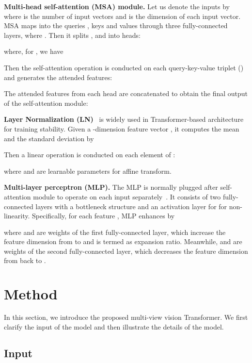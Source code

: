 \documentclass{bmvc2k}
\begin{document}
\vspace{0.1in}
\noindent \textbf{Multi-head self-attention (MSA) module.} Let us denote the inputs by  where  is the number of input vectors and  is the dimension of each input vector. MSA maps  into the queries , keys  and values  through three fully-connected layers, where . Then it splits ,  and  into  heads:

where, for , we have

Then the self-attention operation is conducted on each query-key-value triplet   () and generates the attended features:

The attended features from each head are concatenated to obtain the final output of the self-attention module:


\noindent \textbf{Layer Normalization (LN)}~\cite{ba2016layer} is widely used in Transformer-based architecture for training stability.  Given a -dimension feature vector , it  computes the mean  and the standard deviation  by

Then a linear operation is conducted on each element of :

where  and  are learnable parameters for affine transform.

\vspace{0.1in}

\noindent \textbf{Multi-layer perceptron (MLP).} The MLP is normally plugged after self-attention module to operate on each input separately~\cite{vaswani2017attention}. It consists of two fully-connected layers with a bottleneck structure and an activation layer for for non-linearity. Specifically, for each feature , MLP enhances  by 

where  and  are weights of the first fully-connected layer,  which increase the feature dimension from  to  and  is termed as expansion ratio. Meanwhile,  and  are weights of the second fully-connected layer,  which decreases the feature dimension from  back to .

\vspace{-0.1in}
\section{Method}
In this section, we introduce the proposed multi-view vision Transformer. We first clarify the input of the model and then illustrate the details of the model.


\vspace{-0.1in}

\subsection{Input} 
\end{document}

